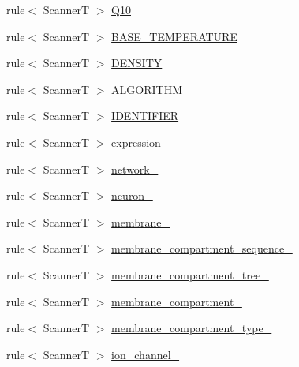 \begin{DoxyCompactItemize}
\item 
rule$<$ ScannerT $>$ \hyperlink{struct_modigliani_model_format_grammar__t_1_1definition_a2331311b1ca73e00b39761e37e07ef64}{Q10}
\item 
rule$<$ ScannerT $>$ \hyperlink{struct_modigliani_model_format_grammar__t_1_1definition_ab0b9b6479d64b6b73749e073d583a862}{BASE\_\-TEMPERATURE}
\item 
rule$<$ ScannerT $>$ \hyperlink{struct_modigliani_model_format_grammar__t_1_1definition_ad1d23859de9c664ec76c4b77771383fb}{DENSITY}
\item 
rule$<$ ScannerT $>$ \hyperlink{struct_modigliani_model_format_grammar__t_1_1definition_ac621d352686780ecbb6d812acbdb952f}{ALGORITHM}
\item 
rule$<$ ScannerT $>$ \hyperlink{struct_modigliani_model_format_grammar__t_1_1definition_a94ef78f7ae8dc3cc52359b1c774e721b}{IDENTIFIER}
\item 
rule$<$ ScannerT $>$ \hyperlink{struct_modigliani_model_format_grammar__t_1_1definition_ad11bbe006d8b2de2c040b4d3541c18ed}{expression\_\-}
\item 
rule$<$ ScannerT $>$ \hyperlink{struct_modigliani_model_format_grammar__t_1_1definition_a253d23c593b32637a504d03c9f8e7fa1}{network\_\-}
\item 
rule$<$ ScannerT $>$ \hyperlink{struct_modigliani_model_format_grammar__t_1_1definition_a7c2a30b6aea9934d91294d2a2dee9113}{neuron\_\-}
\item 
rule$<$ ScannerT $>$ \hyperlink{struct_modigliani_model_format_grammar__t_1_1definition_abbe4599d73fa9f7c542b824b7af164c2}{membrane\_\-}
\item 
rule$<$ ScannerT $>$ \hyperlink{struct_modigliani_model_format_grammar__t_1_1definition_aacdcecc91074e2cadd0ccbae8bea6023}{membrane\_\-compartment\_\-sequence\_\-}
\item 
rule$<$ ScannerT $>$ \hyperlink{struct_modigliani_model_format_grammar__t_1_1definition_a550df22f0faac0b42234950bcd3fc16b}{membrane\_\-compartment\_\-tree\_\-}
\item 
rule$<$ ScannerT $>$ \hyperlink{struct_modigliani_model_format_grammar__t_1_1definition_a66b261c975e102ce60c1289acfaa686b}{membrane\_\-compartment\_\-}
\item 
rule$<$ ScannerT $>$ \hyperlink{struct_modigliani_model_format_grammar__t_1_1definition_ac3336f617b1e498a7def14ff1c96a471}{membrane\_\-compartment\_\-type\_\-}
\item 
rule$<$ ScannerT $>$ \hyperlink{struct_modigliani_model_format_grammar__t_1_1definition_a0464213d954cc58af82536dd2cb07e32}{ion\_\-channel\_\-}

\end{DoxyCompactItemize}
